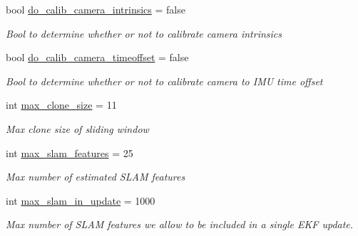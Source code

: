 \begin{DoxyCompactItemize}
bool \hyperlink{structov__msckf_1_1StateOptions_aff5471acfde8d4ddd4cd44e940be5177}{do\+\_\+calib\+\_\+camera\+\_\+intrinsics} = false
\begin{DoxyCompactList}\small\item\em Bool to determine whether or not to calibrate camera intrinsics \end{DoxyCompactList}\item 
\mbox{\label{structov__msckf_1_1StateOptions_a05dd7ee2f2acaadfbcabfad00a26df25}} 
bool \hyperlink{structov__msckf_1_1StateOptions_a05dd7ee2f2acaadfbcabfad00a26df25}{do\+\_\+calib\+\_\+camera\+\_\+timeoffset} = false
\begin{DoxyCompactList}\small\item\em Bool to determine whether or not to calibrate camera to I\+MU time offset \end{DoxyCompactList}\item 
\mbox{\label{structov__msckf_1_1StateOptions_a3fbf23951c9d379f51847348f775cfc9}} 
int \hyperlink{structov__msckf_1_1StateOptions_a3fbf23951c9d379f51847348f775cfc9}{max\+\_\+clone\+\_\+size} = 11
\begin{DoxyCompactList}\small\item\em Max clone size of sliding window \end{DoxyCompactList}\item 
\mbox{\label{structov__msckf_1_1StateOptions_af486dff48a918b3afed0176558d86f65}} 
int \hyperlink{structov__msckf_1_1StateOptions_af486dff48a918b3afed0176558d86f65}{max\+\_\+slam\+\_\+features} = 25
\begin{DoxyCompactList}\small\item\em Max number of estimated S\+L\+AM features \end{DoxyCompactList}\item 
\mbox{\label{structov__msckf_1_1StateOptions_a13760012f68a944b2b59e9f83bbc9bc5}} 
int \hyperlink{structov__msckf_1_1StateOptions_a13760012f68a944b2b59e9f83bbc9bc5}{max\+\_\+slam\+\_\+in\+\_\+update} = 1000
\begin{DoxyCompactList}\small\item\em Max number of S\+L\+AM features we allow to be included in a single E\+KF update. \end{DoxyCompactList}\item 

\end{DoxyCompactItemize}
